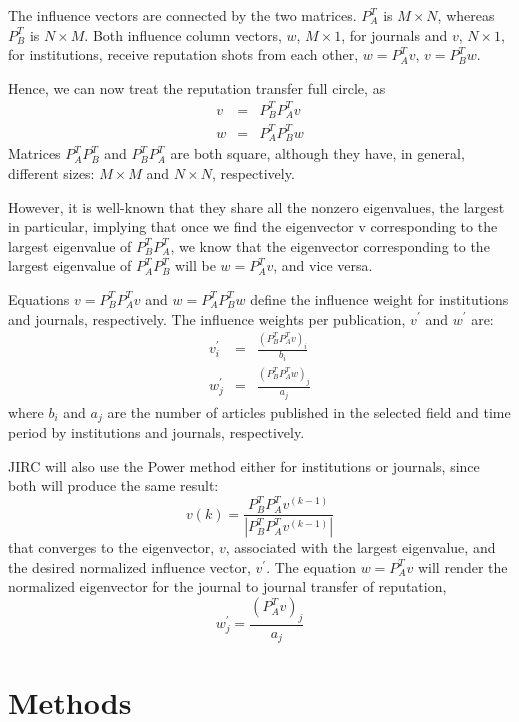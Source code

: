 \documentclass[10pt]{article}
\begin{document}
The influence vectors are connected by the two matrices. $P_A^T$ is $M\times N$, whereas $P_B^T$ is $N\times M$. Both influence column vectors, $w$, $M\times1$, for journals and $v$, $N\times1$, for institutions, receive reputation shots from each other, $w=P_A^Tv$, $v=P_B^Tw$.

Hence, we can now treat the reputation transfer full circle, as
\begin{eqnarray}
 v & = & P_B^TP_A^Tv\\
 w & = & P_A^TP_B^Tw
 \end{eqnarray}
 Matrices $P_A^TP_B^T$ and $P_B^TP_A^T$ are both square, although they have, in general, different sizes: $M\times M$ and $N\times N$, respectively.

 However, it is well-known that they share all the nonzero eigenvalues, the largest in particular, implying that once we find the eigenvector v corresponding to the largest eigenvalue of $P_B^TP_A^T$, we know that the eigenvector corresponding to the largest eigenvalue of $P_A^TP_B^T$ will be $w=P_A^Tv$, and vice versa.

Equations $v=P_B^TP_A^Tv$ and $w=P_A^TP_B^Tw$ define the influence weight for institutions and journals, respectively. The influence weights per
publication, $v^{\prime}$ and $w^{\prime}$ are:
\begin{eqnarray*}
v^{\prime}_i &=& \frac{(P_B^TP_A^Tv)_i}{b_{i}} \\
w^{\prime}_j &=& \frac{(P_B^TP_A^Tw)_j}{a_{j}}
\end{eqnarray*}
where $b_i$ and $a_j$ are the number of articles published  in the selected field and time period by institutions and journals, respectively.


\noindent JIRC will also  use the Power method either for institutions or journals, since both will produce the same result:
\begin{equation}
v(k)=\frac{P_B^TP_A^Tv^{(k-1)}}{|P_B^TP_A^Tv^{(k-1)}|}
\label{pm}
\end{equation}
that converges to the eigenvector, $v$, associated with the largest eigenvalue,  and the desired normalized influence vector, $v^{\prime}$. The equation $w=P_A^Tv$ will render the normalized eigenvector for the journal to journal transfer of reputation,
\begin{equation}
w^{\prime}_j =
\frac{(P_A^Tv)_j}{a_{j}}
\end{equation}
\section{Methods}
\end{document}
